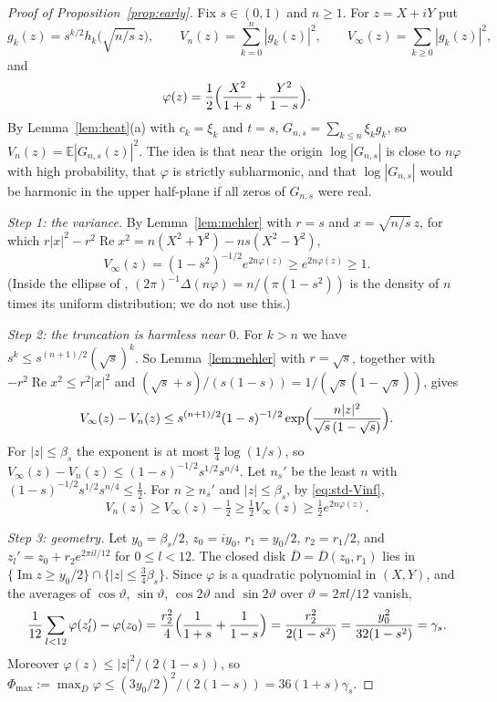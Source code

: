 \documentclass[11pt]{amsart}
\theoremstyle{definition}
\theoremstyle{remark}
\numberwithin{equation}{section}
\newcommand{\E}{\mathbb{E}}
\DeclareMathOperator{\re}{Re}
\DeclareMathOperator{\im}{Im}
\begin{document}
\begin{proof}[Proof of Proposition~\ref{prop:early}]
Fix $s\in(0,1)$ and $n\ge1$. For $z=X+iY$ put
\[
g_k(z)=s^{k/2}h_k\bigl(\sqrt{n/s}\,z\bigr),\qquad V_n(z)=\sum_{k=0}^{n}|g_k(z)|^2,\qquad V_\infty(z)=\sum_{k\ge0}|g_k(z)|^2,
\]
and
\[
\varphi(z)=\frac12\Bigl(\frac{X^2}{1+s}+\frac{Y^2}{1-s}\Bigr).
\]
By Lemma~\ref{lem:heat}(a) with $c_k=\xi_k$ and $t=s$, $G_{n,s}=\sum_{k\le n}\xi_kg_k$, so $V_n(z)=\E|G_{n,s}(z)|^2$. The idea is that near the origin $\log|G_{n,s}|$ is close to $n\varphi$ with high probability, that $\varphi$ is strictly subharmonic, and that $\log|G_{n,s}|$ would be harmonic in the upper half-plane if all zeros of $G_{n,s}$ were real.

\emph{Step 1: the variance.} By Lemma~\ref{lem:mehler} with $r=s$ and $x=\sqrt{n/s}\,z$, for which $r|x|^2-r^2\re x^2=n(X^2+Y^2)-ns(X^2-Y^2)$,
\begin{equation}\label{eq:std-Vinf}
V_\infty(z)=(1-s^2)^{-1/2}e^{2n\varphi(z)}\ge e^{2n\varphi(z)}\ge1 .
\end{equation}
(Inside the ellipse of \cite{HHJK}, $(2\pi)^{-1}\Delta(n\varphi)=n/(\pi(1-s^2))$ is the density of $n$ times its uniform distribution; we do not use this.)

\emph{Step 2: the truncation is harmless near $0$.} For $k>n$ we have $s^k\le s^{(n+1)/2}(\sqrt s)^k$. So Lemma~\ref{lem:mehler} with $r=\sqrt s$, together with $-r^2\re x^2\le r^2|x|^2$ and $(\sqrt s+s)/(s(1-s))=1/(\sqrt s(1-\sqrt s))$, gives
\[
V_\infty(z)-V_n(z)\le s^{(n+1)/2}(1-s)^{-1/2}\exp\Bigl(\frac{n|z|^2}{\sqrt s\,(1-\sqrt s)}\Bigr).
\]
For $|z|\le\beta_s$ the exponent is at most $\frac n4\log(1/s)$, so $V_\infty(z)-V_n(z)\le(1-s)^{-1/2}s^{1/2}s^{n/4}$. Let $n_s'$ be the least $n$ with $(1-s)^{-1/2}s^{1/2}s^{n/4}\le\frac12$. For $n\ge n_s'$ and $|z|\le\beta_s$, by \eqref{eq:std-Vinf},
\begin{equation}\label{eq:std-Vn}
V_n(z)\ge V_\infty(z)-\tfrac12\ge\tfrac12V_\infty(z)\ge\tfrac12e^{2n\varphi(z)} .
\end{equation}

\emph{Step 3: geometry.} Let $y_0=\beta_s/2$, $z_0=iy_0$, $r_1=y_0/2$, $r_2=r_1/2$, and $z_l'=z_0+r_2e^{2\pi il/12}$ for $0\le l<12$. The closed disk $\overline D=\overline D(z_0,r_1)$ lies in $\{\im z\ge y_0/2\}\cap\{|z|\le\frac34\beta_s\}$. Since $\varphi$ is a quadratic polynomial in $(X,Y)$, and the averages of $\cos\vartheta$, $\sin\vartheta$, $\cos2\vartheta$ and $\sin2\vartheta$ over $\vartheta=2\pi l/12$ vanish,
\begin{equation}\label{eq:std-gain}
\frac1{12}\sum_{l<12}\varphi(z_l')-\varphi(z_0)=\frac{r_2^2}4\Bigl(\frac1{1+s}+\frac1{1-s}\Bigr)=\frac{r_2^2}{2(1-s^2)}=\frac{y_0^2}{32(1-s^2)}=\gamma_s .
\end{equation}
Moreover $\varphi(z)\le|z|^2/(2(1-s))$, so $\Phi_{\max}:=\max_{\overline D}\varphi\le(3y_0/2)^2/(2(1-s))=36(1+s)\gamma_s$.


\end{proof}
\end{document}
